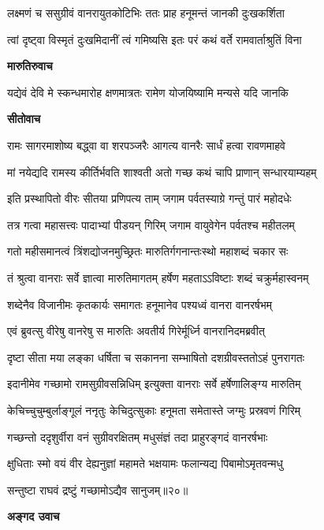 \twolineshloka
{लक्ष्मणं च ससुग्रीवं वानरायुतकोटिभिः}
{ततः प्राह हनूमन्तं जानकी दुःखकर्शिता} %

\twolineshloka
{त्वां दृष्ट्वा विस्मृतं दुःखमिदानीं त्वं गमिष्यसि}
{इतः परं कथं वर्ते रामवार्ताश्रुतिं विना} %

\textbf{मारुतिरुवाच}

\twolineshloka
{यद्येवं देवि मे स्कन्धमारोह क्षणमात्रतः}
{रामेण योजयिष्यामि मन्यसे यदि जानकि} %

\textbf{सीतोवाच}

\twolineshloka
{रामः सागरमाशोष्य बद्ध्वा वा शरपञ्जरैः}
{आगत्य वानरैः सार्धं हत्वा रावणमाहवे} %

\twolineshloka
{मां नयेद्यदि रामस्य कीर्तिर्भवति शाश्वती}
{अतो गच्छ कथं चापि प्राणान् सन्धारयाम्यहम्} %

\twolineshloka
{इति प्रस्थापितो वीरः सीतया प्रणिपत्य ताम्}
{जगाम पर्वतस्याग्रे गन्तुं पारं महोदधेः} %

\twolineshloka
{तत्र गत्वा महासत्त्वः पादाभ्यां पीडयन् गिरिम्}
{जगाम वायुवेगेन पर्वतश्च महीतलम्} %

\twolineshloka
{गतो महीसमानत्वं त्रिंशद्योजनमुच्छ्रितः}
{मारुतिर्गगनान्तःस्थो महाशब्दं चकार सः} %

\twolineshloka
{तं श्रुत्वा वानराः सर्वे ज्ञात्वा मारुतिमागतम्}
{हर्षेण महताऽऽविष्टाः शब्दं चक्रुर्महास्वनम्} %

\twolineshloka
{शब्देनैव विजानीमः कृतकार्यः समागतः}
{हनूमानेव पश्यध्वं वानरा वानरर्षभम्} %

\twolineshloka
{एवं ब्रुवत्सु वीरेषु वानरेषु स मारुतिः}
{अवतीर्य गिरेर्मूर्ध्नि वानरानिदमब्रवीत्} %

\twolineshloka
{दृष्टा सीता मया लङ्का धर्षिता च सकानना}
{सम्भाषितो दशग्रीवस्ततोऽहं पुनरागतः} %

\twolineshloka
{इदानीमेव गच्छामो रामसुग्रीवसन्निधिम्}
{इत्युक्ता वानराः सर्वे हर्षेणालिङ्ग्य मारुतिम्} %

\twolineshloka
{केचिच्चुचुम्बुर्लाङ्गूलं ननृतुः केचिदुत्सुकाः}
{हनूमता समेतास्ते जग्मुः प्रस्रवणं गिरिम्} %

\twolineshloka
{गच्छन्तो ददृशुर्वीरा वनं सुग्रीवरक्षितम्}
{मधुसंज्ञं तदा प्राहुरङ्गदं वानरर्षभाः} %

\twolineshloka
{क्षुधिताः स्मो वयं वीर देह्यनुज्ञां महामते}
{भक्षयामः फलान्यद्य पिबामोऽमृतवन्मधु} %

{सन्तुष्टा राघवं द्रष्टुं गच्छामोऽद्यैव सानुजम्॥२०॥} %


\textbf{अङ्गद उवाच}

